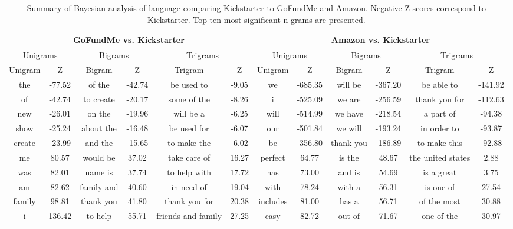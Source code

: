 \documentclass[letterpaper]{article}
\begin{document}
\begin{table}[t]
\centering
\scriptsize
\begin{tabular}{|*{12}{c|}}  %
\hline
\multicolumn{6}{|c}{GoFundMe vs. Kickstarter} & \multicolumn{6}{|c|}{Amazon vs. Kickstarter} \\ \hline
\multicolumn{2}{|c}{Unigrams} & \multicolumn{2}{|c}{Bigrams} & \multicolumn{2}{|c}{Trigrams} & 
\multicolumn{2}{|c}{Unigrams} & \multicolumn{2}{|c}{Bigrams} & \multicolumn{2}{|c|}{Trigrams} \\ \hline 
Unigram & Z & Bigram & Z & Trigram & Z & Unigram & Z & Bigram & Z & Trigram & Z \\ \hline
the & -77.52 & of the & -42.74 & be used to & -9.05 &
we & -685.35 & will be & -367.20 & be able to & -141.92 \\\hline
of & -42.74 & to create & -20.17 & some of the & -8.26 &
i & -525.09 & we are & -256.59 & thank you for & -112.63 \\\hline
new & -26.01 & on the & -19.96 & will be a & -6.25 &
will & -514.99 & we have & -218.54 & a part of & -94.38 \\\hline
show & -25.24 & about the & -16.48 & be used for & -6.07 &
our & -501.84 & we will & -193.24 & in order to & -93.87 \\\hline
create & -23.99 & and the & -15.65 & to make the & -6.02 &
be & -356.80 & thank you & -186.89 & to make this & -92.88 \\\hline \hline

me & 80.57 & would be & 37.02 & take care of & 16.27 &
perfect & 64.77 & is the & 48.67 & the united states & 2.88 \\\hline
was & 82.01 & name is & 37.74 & to help with & 17.72 &
has & 73.00 & and is & 54.69 & is a great & 3.75\\\hline
am & 82.62 & family and & 40.60 & in need of & 19.04 &
with & 78.24 & with a & 56.31 & is one of & 27.54\\\hline
family & 98.81 & thank you & 41.80 & thank you for & 20.38 &
includes & 81.00 & has a & 56.71 & of the most & 30.88\\\hline
i & 136.42 & to help & 55.71 & friends and family & 27.25 &
easy & 82.72 & out of & 71.67 & one of the & 30.97 \\\hline
\end{tabular}
\caption{Summary of Bayesian analysis of language comparing Kickstarter to GoFundMe and Amazon. Negative Z-scores correspond to Kickstarter. Top ten most significant n-grams are presented.}
\label{tab:pairwise}
\end{table}
\end{document}
